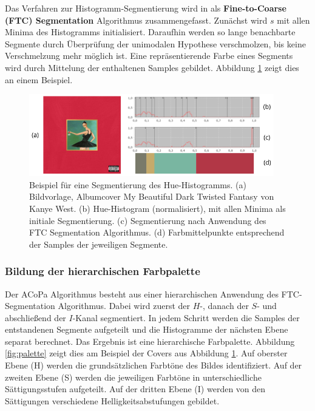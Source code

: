 Das Verfahren zur Histogramm-Segmentierung wird in \citep{ftc} als \textbf{Fine-to-Coarse (FTC) Segmentation} Algorithmus zusammengefasst. Zunächst wird $s$ mit allen Minima des Histogramms initialisiert. Daraufhin werden so lange benachbarte Segmente durch Überprüfung der unimodalen Hypothese verschmolzen, bis keine Verschmelzung mehr möglich ist. Eine repräsentierende Farbe eines Segments wird durch Mittelung der enthaltenen Samples gebildet. Abbildung \ref{fig:h_segmentation} zeigt dies an einem Beispiel.

\begin{figure}[]
\centering
\includegraphics[width=0.95\textwidth]{img/h_segmentation.png}
\caption{Beispiel für eine Segmentierung des Hue-Histogramms. (a) Bildvorlage, Albumcover \glqq{}My Beautiful Dark Twisted Fantasy\grqq{} von Kanye West. (b) Hue-Histogram (normalisiert), mit allen Minima als initiale Segmentierung. (c) Segmentierung nach Anwendung des FTC Segmentation Algorithmus. (d) Farbmittelpunkte entsprechend der Samples der jeweiligen Segmente.}
\label{fig:h_segmentation}
\end{figure}

\subsubsection{Bildung der hierarchischen Farbpalette}
\label{sec:hierarchische-farbpalette}

Der ACoPa Algorithmus besteht aus einer hierarchischen Anwendung des FTC-Segmentation Algorithmus. Dabei wird zuerst der $H$-, danach der $S$- und abschließend der $I$-Kanal segmentiert. In jedem Schritt werden die Samples der entstandenen Segmente aufgeteilt und die Histogramme der nächsten Ebene separat berechnet. Das Ergebnis ist eine hierarchische Farbpalette. Abbildung \ref{fig:palette} zeigt dies am Beispiel der Covers aus Abbildung \ref{fig:h_segmentation}. Auf oberster Ebene (H) werden die grundsätzlichen Farbtöne des Bildes identifiziert. Auf der zweiten Ebene (S) werden die jeweiligen Farbtöne in unterschiedliche Sättigungsstufen aufgeteilt. Auf der dritten Ebene (I) werden von den Sättigungen verschiedene Helligkeitsabstufungen gebildet.

